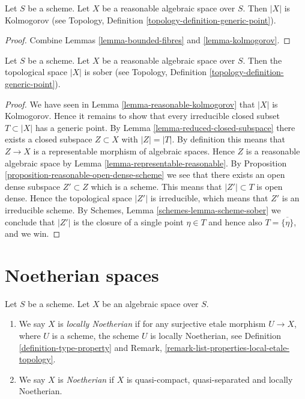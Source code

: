 \begin{lemma}
\label{lemma-reasonable-kolmogorov}
Let $S$ be a scheme.
Let $X$ be a reasonable algebraic space over $S$.
Then $|X|$ is Kolmogorov (see
Topology, Definition \ref{topology-definition-generic-point}).
\end{lemma}

\begin{proof}
Combine Lemmas \ref{lemma-bounded-fibres} and
\ref{lemma-kolmogorov}.
\end{proof}

\begin{proposition}
\label{proposition-reasonable-sober}
Let $S$ be a scheme.
Let $X$ be a reasonable algebraic space over $S$.
Then the topological space $|X|$ is sober (see
Topology, Definition \ref{topology-definition-generic-point}).
\end{proposition}

\begin{proof}
We have seen in
Lemma \ref{lemma-reasonable-kolmogorov}
that $|X|$ is Kolmogorov.
Hence it remains to show that every irreducible closed subset
$T \subset |X|$ has a generic point. By
Lemma \ref{lemma-reduced-closed-subspace}
there exists a closed subspace $Z \subset X$ with $|Z| = |T|$.
By definition this means that $Z \to X$ is a representable morphism
of algebraic spaces. Hence $Z$ is a reasonable algebraic space
by Lemma \ref{lemma-representable-reasonable}. By
Proposition \ref{proposition-reasonable-open-dense-scheme}
we see that there exists an open dense subspace $Z' \subset Z$
which is a scheme. This means that $|Z'| \subset T$ is open dense.
Hence the topological space $|Z'|$ is irreducible, which means that
$Z'$ is an irreducible scheme. By
Schemes, Lemma \ref{schemes-lemma-scheme-sober}
we conclude that $|Z'|$ is the closure of a single point $\eta \in T$
and hence also $T = \overline{\{\eta\}}$, and we win.
\end{proof}










\section{Noetherian spaces}
\label{section-noetherian}

\begin{definition}
\label{definition-noetherian}
Let $S$ be a scheme. Let $X$ be an algebraic space over $S$.
\begin{enumerate}
\item We say $X$ is {\it locally Noetherian} if for any surjective etale
morphism $U \to X$, where $U$ is a scheme, the scheme $U$ is
locally Noetherian, see
Definition \ref{definition-type-property} and
Remark, \ref{remark-list-properties-local-etale-topology}.
\item We say $X$ is {\it Noetherian}
if $X$ is quasi-compact, quasi-separated and locally Noetherian.
\end{enumerate}
\end{definition}

